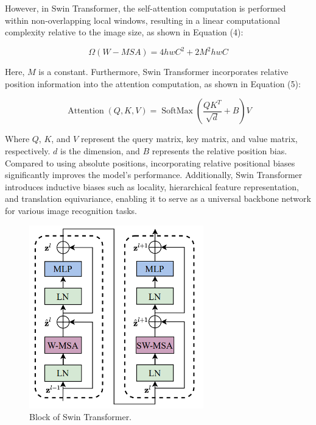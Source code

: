 \documentclass[10pt,twocolumn,a4paper]{article}
\begin{document}
However, in Swin Transformer, the self-attention computation is performed within non-overlapping local windows, resulting in a linear computational complexity relative to the image size, as shown in Equation (4):

\begin{equation}
  \Omega(W-M S A)=4 h w C^2+2 M^2 h w C
\end{equation}

Here, $M$ is a constant.
Furthermore, Swin Transformer incorporates relative position information into the attention computation, as shown in Equation (5):

\begin{equation}
  \operatorname{Attention}(Q, K, V)=\operatorname{SoftMax}\left(\frac{Q K^T}{\sqrt{d}}+B\right) V
\end{equation}

Where $Q$, $K$, and $V$ represent the query matrix, key matrix, and value matrix, respectively. $d$ is the dimension, and $B$ represents the relative position bias. Compared to using absolute positions, incorporating relative positional biases significantly improves the model's performance.
Additionally, Swin Transformer introduces inductive biases such as locality, hierarchical feature representation, and translation equivariance, enabling it to serve as a universal backbone network for various image recognition tasks.

\begin{figure}[htbp]   %
	\centering
	\includegraphics[width=0.8\linewidth,scale=1.00]{Images/ST_2.png}
	\caption{Block of Swin Transformer.}
	\label{fig:st_2}
\end{figure}
\end{document}
